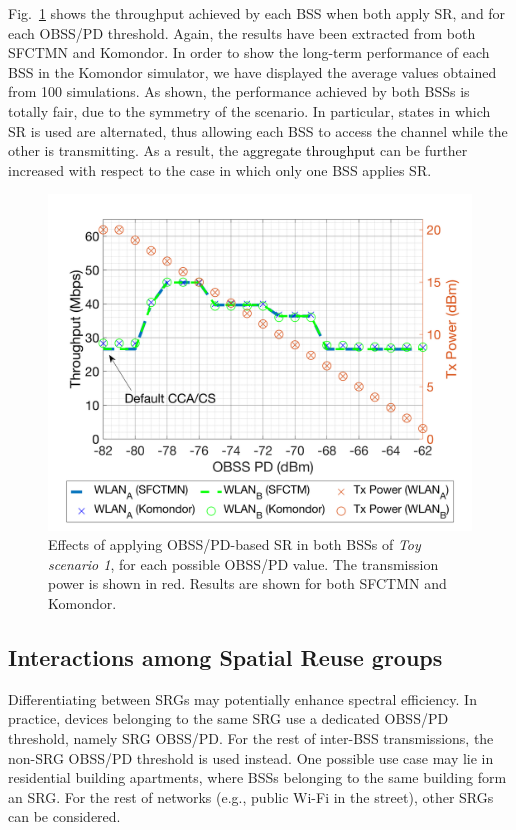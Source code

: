 \documentclass[preprint,12pt]{elsarticle}
\begin{document}
Fig.~\ref{fig:toy_scenario_1c_results} shows the throughput achieved by each BSS when both apply SR, and for each OBSS/PD threshold. Again, the results have been extracted from both SFCTMN and Komondor. In order to show the long-term performance of each BSS in the Komondor simulator, we have displayed the average values obtained from 100 simulations. As shown, the performance achieved by both BSSs is totally fair, due to the symmetry of the scenario. In particular, states in which SR is used are alternated, thus allowing each BSS to access the channel while the other is transmitting. As a result, the \textcolor{black}{aggregate throughput} can be further increased with respect to the case in which only one BSS applies SR. %

\begin{figure}[ht!]
	\centering
	\includegraphics[width=.6\columnwidth]{SIM_1_1b}
	\caption{Effects of applying OBSS/PD-based SR in both BSSs of \emph{Toy scenario 1}, for each possible OBSS/PD value. The transmission power is shown in red. Results are shown for both SFCTMN and Komondor.}		
	\label{fig:toy_scenario_1c_results}
\end{figure}

\subsection{Interactions among Spatial Reuse groups}
\label{section:advanced_interactions}
Differentiating between SRGs may potentially enhance spectral efficiency. In practice, devices belonging to the same SRG use a dedicated OBSS/PD threshold, namely SRG OBSS/PD. For the rest of inter-BSS transmissions, the non-SRG OBSS/PD threshold is used instead. One possible use case may lie in residential building apartments, where BSSs belonging to the same building form an SRG. For the rest of networks (e.g., public Wi-Fi in the street), other SRGs can be considered. 
\end{document}
